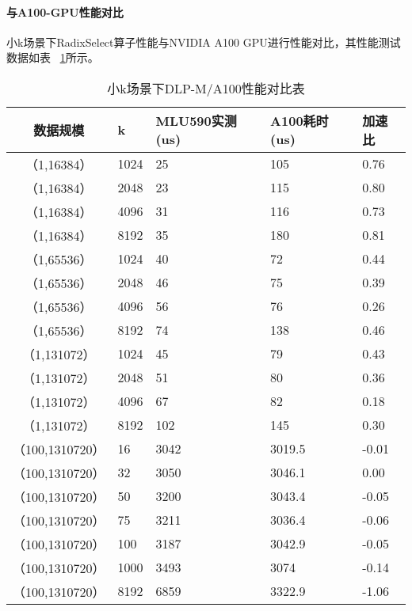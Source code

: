 \paragraph{与A100-GPU性能对比}
小k场景下RadixSelect算子性能与NVIDIA A100 GPU进行性能对比，其性能测试数据如表
~\ref{tab:lkvsa100}所示。
\begin{table}
    \centering
    \caption{小k场景下DLP-M/A100性能对比表}
    \begin{tabular}{cllll}
    \toprule
    数据规模 & k &   MLU590实测(us) & A100耗时(us) & 加速比 \\
    \midrule
    （1,16384） & 1024    & 25 & 105 & 0.76 \\
    （1,16384） & 2048   & 23 & 115 & 0.80 \\
    （1,16384） & 4096   & 31 & 116 & 0.73 \\
    （1,16384） & 8192   & 35 & 180 & 0.81 \\
    （1,65536） & 1024    & 40 & 72 & 0.44 \\
    （1,65536） & 2048    & 46 & 75 & 0.39 \\
    （1,65536） & 4096    & 56 & 76 & 0.26 \\
    （1,65536） & 8192   & 74 & 138 & 0.46 \\

    （1,131072） & 1024    & 45 & 79 & 0.43 \\
    （1,131072） & 2048    & 51 & 80 & 0.36 \\
    （1,131072） & 4096    & 67 & 82 & 0.18 \\
    （1,131072） & 8192   & 102 & 145 & 0.30 \\
    

    （100,1310720） &16      & 3042 & 3019.5 &  -0.01\\
    （100,1310720） &32 &  3050& 3046.1 &  0.00\\
    （100,1310720） &50  & 3200 & 3043.4 &  -0.05 \\
    （100,1310720） &75   & 3211 & 3036.4 &  -0.06 \\
    （100,1310720） &100    & 3187& 3042.9 &  -0.05 \\
    （100,1310720） &1000   & 3493& 3074   &   -0.14 \\
    （100,1310720） &8192    & 6859& 3322.9 & -1.06 \\

    \bottomrule
    \end{tabular}
\label{tab:lkvsa100}    
\end{table}
    
